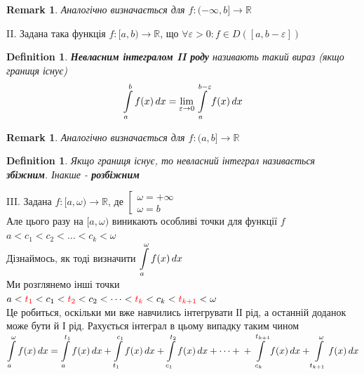 \documentclass[a4paper, 14pt]{extarticle}
\def\huge{\displaystyle}
\theoremstyle{theoremdd}
\theoremstyle{theoremdd}
\newtheorem{definition}[theorem]{Definition}
\theoremstyle{theoremdd}
\theoremstyle{theoremdd}
\theoremstyle{theoremdd}
\theoremstyle{theoremdd}
\newtheorem{remark}[theorem]{Remark}
\theoremstyle{theoremdd}
\theoremstyle{theoremdd}
\begin{document}
\begin{remark}
Аналогічно визначається для $f: (-\infty,b] \to \mathbb{R}$
\end{remark}

II. Задана така функція $f: [a,b) \to \mathbb{R}$, що $\forall \varepsilon > 0: f \in D([a,b-\varepsilon])$
\begin{definition}
\textbf{Невласним інтегралом II роду} називають такий вираз (якщо границя існує)
\begin{align*}
\int\displaylimits_a^b f(x)\,dx = \lim_{\varepsilon \to 0} \int\displaylimits_a^{b-\varepsilon} f(x)\,dx
\end{align*}
\end{definition}

\begin{remark}
Аналогічно визначається для $f: (a,b] \to \mathbb{R}$
\end{remark}

\begin{definition}
Якщо границя існує, то невласний інтеграл називається \textbf{збіжним}. Інакше - \textbf{розбіжним}
\end{definition}

III. Задана $f: [a, \omega) \to \mathbb{R}$, де $\left[ \begin{gathered} \omega = +\infty \\ \omega = b \end{gathered} \right.$\\
Але цього разу на $[a,\omega)$ виникають особливі точки для функції $f$\\
$a < c_1 < c_2 < \dots < c_k < \omega$\\
Дізнаймось, як тоді визначити $\huge\int\displaylimits_a^\omega f(x)\,dx$\\
Ми розглянемо інші точки \\ $a < \textcolor{red}{t_1} < c_1 < \textcolor{red}{t_2} < c_2 < \dots < \textcolor{red}{t_k} < c_k < \textcolor{red}{t_{k+1}} < \omega$\\
Це робиться, оскільки ми вже навчились інтегрувати ІІ рід, а останній доданок може бути й І рід. Рахується інтеграл в цьому випадку таким чином\\
$\huge\int\displaylimits_a^\omega f(x)\,dx = \int\displaylimits_a^{t_1} f(x)\,dx + \int\displaylimits_{t_1}^{c_1} f(x)\,dx + \int\displaylimits_{c_1}^{t_2} f(x)\,dx + \dots + \\ + \int\displaylimits_{c_k}^{t_{k+1}} f(x)\,dx + \int\displaylimits_{t_{k+1}}^{\omega} f(x)\,dx$\\
\end{document}
